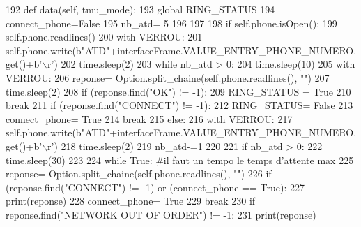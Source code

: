 \begin{DoxyCode}
192     \textcolor{keyword}{def }data(self, tmu\_mode):
193         \textcolor{keyword}{global} RING\_STATUS
194         connect\_phone=\textcolor{keyword}{False}
195         nb\_atd= 5
196 
197 
198         \textcolor{keywordflow}{if} self.phone.isOpen():
199             self.phone.readlines()
200             with VERROU:
201                 self.phone.write(b\textcolor{stringliteral}{"ATD"}+interfaceFrame.VALUE\_ENTRY\_PHONE\_NUMERO.get()+b\textcolor{stringliteral}{'\(\backslash\)r'})
202                 time.sleep(2)
203             \textcolor{keywordflow}{while} nb\_atd > 0:
204                 time.sleep(10)
205                 with VERROU:
206                     reponse= Option.split\_chaine(self.phone.readlines(), \textcolor{stringliteral}{""})
207                     time.sleep(2)
208                 \textcolor{keywordflow}{if} (reponse.find(\textcolor{stringliteral}{"OK"}) != -1):
209                     RING\_STATUS = \textcolor{keyword}{True}
210                     \textcolor{keywordflow}{break}
211                 \textcolor{keywordflow}{if} (reponse.find(\textcolor{stringliteral}{"CONNECT"}) != -1):
212                     RING\_STATUS= \textcolor{keyword}{False}
213                     connect\_phone= \textcolor{keyword}{True}
214                     \textcolor{keywordflow}{break}
215                 \textcolor{keywordflow}{else}:
216                     with VERROU:
217                         self.phone.write(b\textcolor{stringliteral}{"ATD"}+interfaceFrame.VALUE\_ENTRY\_PHONE\_NUMERO.get()+b\textcolor{stringliteral}{'\(\backslash\)r'})
218                         time.sleep(2)
219                 nb\_atd-=1
220             
221             \textcolor{keywordflow}{if} nb\_atd > 0:
222                 time.sleep(30)
223                 
224                 \textcolor{keywordflow}{while} \textcolor{keyword}{True}: \textcolor{comment}{#il faut un tempo le temps d'attente max
}
225                     reponse= Option.split\_chaine(self.phone.readlines(), \textcolor{stringliteral}{""})
226                     \textcolor{keywordflow}{if} (reponse.find(\textcolor{stringliteral}{"CONNECT"}) != -1) \textcolor{keywordflow}{or} (connect\_phone == \textcolor{keyword}{True}):
227                         print(reponse)
228                         connect\_phone= \textcolor{keyword}{True}
229                         \textcolor{keywordflow}{break}
230                     \textcolor{keywordflow}{if} reponse.find(\textcolor{stringliteral}{"NETWORK OUT OF ORDER"}) != -1:
231                         print(reponse)

\end{DoxyCode}
